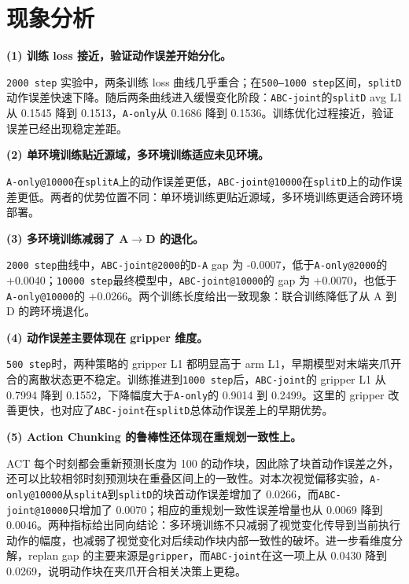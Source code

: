 \documentclass{article}
\begin{document}
\section{现象分析}

\noindent\textbf{(1) 训练 loss 接近，验证动作误差开始分化。}
\par
\texttt{2000 step} 实验中，两条训练 loss 曲线几乎重合；在\texttt{500--1000 step}区间，\texttt{splitD}动作误差快速下降。随后两条曲线进入缓慢变化阶段：\texttt{ABC-joint}的\texttt{splitD} avg L1 从 0.1545 降到 0.1513，\texttt{A-only}从 0.1686 降到 0.1536。训练优化过程接近，验证误差已经出现稳定差距。

\noindent\textbf{(2) 单环境训练贴近源域，多环境训练适应未见环境。}
\par
\texttt{A-only@10000}在\texttt{splitA}上的动作误差更低，\texttt{ABC-joint@10000}在\texttt{splitD}上的动作误差更低。两者的优势位置不同：单环境训练更贴近源域，多环境训练更适合跨环境部署。

\noindent\textbf{(3) 多环境训练减弱了 A$\rightarrow$D 的退化。}
\par
\texttt{2000 step}曲线中，\texttt{ABC-joint@2000}的\texttt{D-A} gap 为 -0.0007，低于\texttt{A-only@2000}的 +0.0040；\texttt{10000 step}最终模型中，\texttt{ABC-joint@10000}的 gap 为 +0.0070，也低于\texttt{A-only@10000}的 +0.0266。两个训练长度给出一致现象：联合训练降低了从 A 到 D 的跨环境退化。

\noindent\textbf{(4) 动作误差主要体现在 gripper 维度。}
\par
\texttt{500 step}时，两种策略的 gripper L1 都明显高于 arm L1，早期模型对末端夹爪开合的离散状态更不稳定。训练推进到\texttt{1000 step}后，\texttt{ABC-joint}的 gripper L1 从 0.7994 降到 0.1552，下降幅度大于\texttt{A-only}的 0.9014 到 0.2499。这里的 gripper 改善更快，也对应了\texttt{ABC-joint}在\texttt{splitD}总体动作误差上的早期优势。

\noindent\textbf{(5) Action Chunking 的鲁棒性还体现在重规划一致性上。}
\par
ACT 每个时刻都会重新预测长度为 100 的动作块，因此除了块首动作误差之外，还可以比较相邻时刻预测块在重叠区间上的一致性。对本次视觉偏移实验，\texttt{A-only@10000}从\texttt{splitA}到\texttt{splitD}的块首动作误差增加了 0.0266，而\texttt{ABC-joint@10000}只增加了 0.0070；相应的重规划一致性误差增量也从 0.0069 降到 0.0046。两种指标给出同向结论：多环境训练不只减弱了视觉变化传导到当前执行动作的幅度，也减弱了视觉变化对后续动作块内部一致性的破坏。进一步看维度分解，replan gap 的主要来源是\texttt{gripper}，而\texttt{ABC-joint}在这一项上从 0.0430 降到 0.0269，说明动作块在夹爪开合相关决策上更稳。
\end{document}
